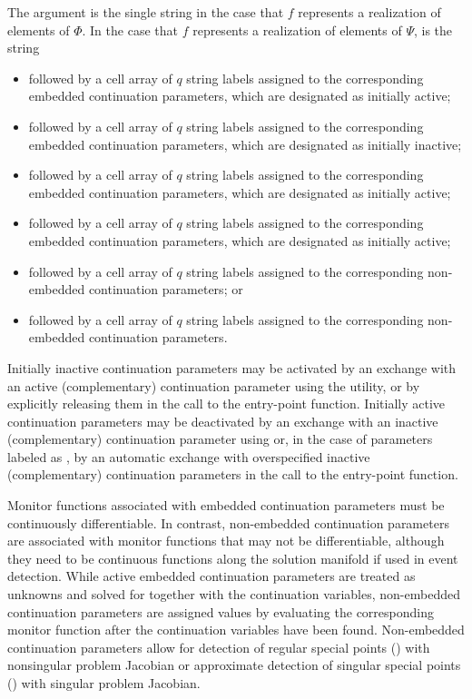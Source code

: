 The argument  is the single string  in the case that $f$ represents a realization of elements of $\Phi$. In the case that $f$ represents a realization of elements of $\Psi$,  is the string
\begin{itemize}
\item {} followed by a cell array of $q$ string labels assigned to the corresponding embedded continuation parameters, which are designated as initially active;
\item {} followed by a cell array of $q$ string labels assigned to the corresponding  embedded continuation parameters, which are designated as initially inactive;
\item {} followed by a cell array of $q$ string labels assigned to the corresponding embedded continuation parameters, which are designated as initially active;
\item {} followed by a cell array of $q$ string labels assigned to the corresponding embedded continuation parameters, which are designated as initially active;
\item {} followed by a cell array of $q$ string labels assigned to the corresponding non-embedded continuation parameters; or
\item {} followed by a cell array of $q$ string labels assigned to the corresponding non-embedded continuation parameters.
\end{itemize}
Initially inactive continuation parameters may be activated by an exchange with an active (complementary) continuation parameter using the  utility, or by explicitly releasing them in the call to the  entry-point function. Initially active continuation parameters may be deactivated by an exchange with an inactive (complementary) continuation parameter using  or, in the case of parameters labeled as , by an automatic exchange with overspecified inactive (complementary) continuation parameters in the call to the  entry-point function. 

Monitor functions associated with embedded continuation parameters must be continuously differentiable. In contrast, non-embedded continuation parameters are associated with monitor functions that may not be differentiable, although they need to be continuous functions along the solution manifold if used in event detection. While active embedded continuation parameters are treated as unknowns and solved for together with the continuation variables, non-embedded continuation parameters are assigned values by evaluating the corresponding monitor function after the continuation variables have been found. Non-embedded continuation parameters allow for detection of regular special points () with nonsingular problem Jacobian or approximate detection of singular special points () with singular problem Jacobian.

